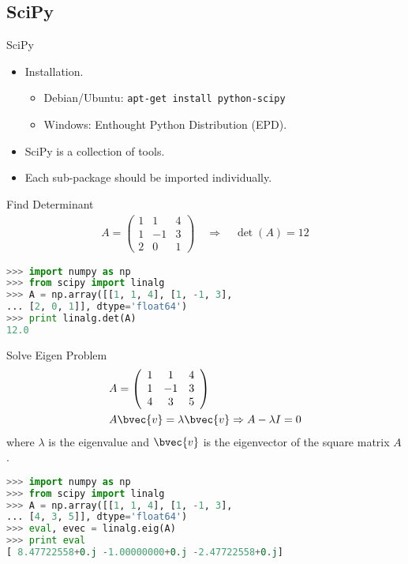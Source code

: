 \documentclass[dvips,xcolor=pst]{beamer}
\begin{document}
\subsection{
SciPy
}

\begin{frame}{
%
SciPy
%
}
\begin{itemize} \large
  \item Installation.
  \begin{itemize} \large
    \item Debian/Ubuntu: \texttt{apt-get install python-scipy}
    \item Windows: Enthought Python Distribution (EPD).
  \end{itemize}
  \item SciPy is a collection of tools.
  \item Each sub-package should be imported individually.
\end{itemize}
\end{frame}

\begin{frame}[fragile]{
%
Find Determinant
%
}
\begin{align*}
  A = \left(\begin{array}{ccc}
    1 & 1 & 4 \\ 1 & -1 & 3 \\ 2 & 0 & 1
  \end{array}\right) \quad \Rightarrow \quad
  \det(A) = 12
\end{align*}
\begin{lstlisting}[language=Python]
>>> import numpy as np
>>> from scipy import linalg
>>> A = np.array([[1, 1, 4], [1, -1, 3],
... [2, 0, 1]], dtype='float64')
>>> print linalg.det(A)
12.0
\end{lstlisting}
\end{frame}

\begin{frame}[fragile]{
%
Solve Eigen Problem
%
}
\begin{align*}
 &A = \left(\begin{array}{ccc}
    1 & 1 & 4 \\ 1 & -1 & 3 \\ 4 & 3 & 5
  \end{array}\right) \\
 &A\bvec{v} = \lambda\bvec{v} \Rightarrow A - \lambda I = 0
\end{align*}
where $\lambda$ is the eigenvalue and $\bvec{v}$ is the eigenvector of the
square matrix $A$.
\begin{lstlisting}[language=Python]
>>> import numpy as np
>>> from scipy import linalg
>>> A = np.array([[1, 1, 4], [1, -1, 3],
... [4, 3, 5]], dtype='float64')
>>> eval, evec = linalg.eig(A)
>>> print eval
[ 8.47722558+0.j -1.00000000+0.j -2.47722558+0.j]
\end{lstlisting}
\end{frame}
\end{document}
